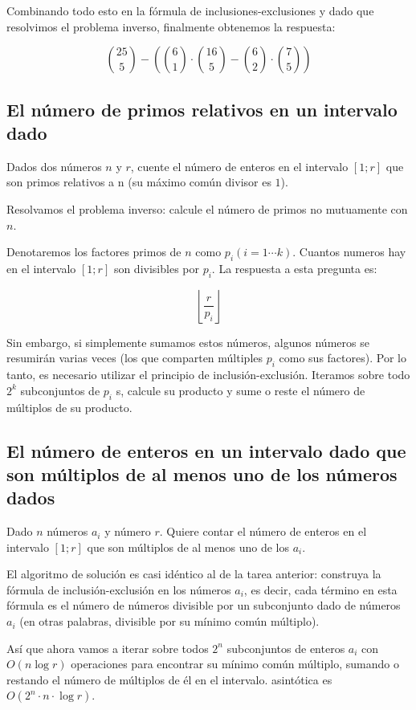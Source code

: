 Combinando todo esto en la fórmula de inclusiones-exclusiones y dado que resolvimos el problema inverso, finalmente obtenemos la respuesta:

$$\binom{25}{5} - \left(\binom{6}{1} \cdot \binom{16}{5} - \binom{6}{2} \cdot \binom{7}{5}\right)$$


\subsection{El número de primos relativos en un intervalo dado}

Dados dos números $n$ y $r$, cuente el número de enteros en el intervalo $[1;r]$ que son primos relativos a n (su máximo común divisor es $1$).

Resolvamos el problema inverso: calcule el número de primos no mutuamente con $n$.

Denotaremos los factores primos de $n$ como $p_i (i = 1\cdots k)$. Cuantos numeros hay en el intervalo $[1;r]$ son divisibles por $p_i$. La respuesta a esta pregunta es:

$$\left\lfloor \frac{ r }{ p_i } \right\rfloor$$

Sin embargo, si simplemente sumamos estos números, algunos números se resumirán varias veces (los que comparten múltiples $p_i$ como sus factores). Por lo tanto, es necesario utilizar el principio de inclusión-exclusión. Iteramos sobre todo $2^k$ subconjuntos de $p_i$ s, calcule su producto y sume o reste el número de múltiplos de su producto.

\subsection{El número de enteros en un intervalo dado que son múltiplos de al menos uno de los números dados}

Dado $n$ números $a_i$ y número $r$. Quiere contar el número de enteros en el intervalo $[1; r]$ que son múltiplos de al menos uno de los $a_i$.

El algoritmo de solución es casi idéntico al de la tarea anterior: construya la fórmula de inclusión-exclusión en los números $a_i$, es decir, cada término en esta fórmula es el número de números divisible por un subconjunto dado de números $a_i$ (en otras palabras, divisible por su mínimo común múltiplo).

Así que ahora vamos a iterar sobre todos $2^n$ subconjuntos de enteros $a_i$ con $O(n \log r)$ operaciones para encontrar su mínimo común múltiplo, sumando o restando el número de múltiplos de él en el intervalo. asintótica es $O(2^n\cdot n\cdot \log r)$.


